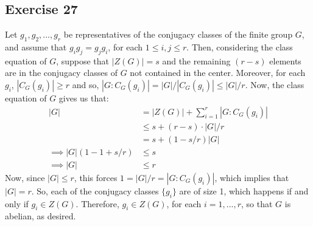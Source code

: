 \subsection*{Exercise 27}
Let $g_1, g_2, ..., g_r$ be representatives of the conjugacy classes of the finite group $G$, and assume that $g_ig_j = g_jg_i$, for each $1 \le i,j \le r$. Then, considering the class equation of $G$, suppose that $|Z(G)| = s$ and the remaining $(r-s)$ elements are in the conjugacy classes of $G$ not contained in the center. Moreover, for each $g_i$, $|C_G(g_i)| \ge r$ and so, $|G:C_G(g_i)| = |G|/|C_G(g_i)| \le |G|/r$. Now, the class equation of $G$ gives us that:
\begin{align*}
    |G| &= |Z(G)| + \sum_{i=1}^r|G:C_G(g_i)| \\
    &\le s + (r-s)\cdot|G|/r \\
    &= s + (1-s/r)|G| \\
    \implies |G|(1 - 1 + s/r) &\le s \\
    \implies |G| & \le r
\end{align*}
Now, since $|G| \le r$, this forces $1 = |G|/r = |G:C_G(g_i)|$, which implies that $|G| = r$. So, each of the conjugacy classes $\{g_i\}$ are of size 1, which happens if and only if $g_i \in Z(G)$. Therefore, $g_i \in Z(G)$, for each $i = 1,...,r$, so that $G$ is abelian, as desired.
